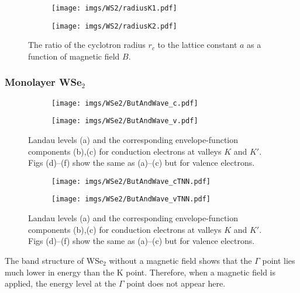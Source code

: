 \documentclass{article}
\begin{document}
\begin{figure}[!h]
	\begin{subfigure}{0.495\textwidth}
		\centering
		\texttt{[image: imgs/WS2/radiusK1.pdf]}
	\end{subfigure}
	\begin{subfigure}{0.495\textwidth}
		\centering
		\texttt{[image: imgs/WS2/radiusK2.pdf]}
	\end{subfigure}
	\caption{The ratio of the cyclotron radius $r_c$ to the lattice constant $a$ as a function of magnetic field $B$.}
\end{figure}
\newpage
\subsubsection*{Monolayer WSe$_{2}$}
\begin{figure}[htb]
	\begin{subfigure}{0.495\textwidth}
		\centering
		\texttt{[image: imgs/WSe2/ButAndWave\_c.pdf]}
	\end{subfigure}
	\begin{subfigure}{0.495\textwidth}
		\centering
		\texttt{[image: imgs/WSe2/ButAndWave\_v.pdf]}
	\end{subfigure}
	\caption{Landau levels (a) and the corresponding envelope-function components (b),(c) for conduction electrons at valleys $K$ and $K'$. Figs (d)–(f) show the same as (a)–(c) but for valence electrons.}
\end{figure}
\begin{figure}[!h]
	\begin{subfigure}{0.495\textwidth}
		\centering
		\texttt{[image: imgs/WSe2/ButAndWave\_cTNN.pdf]}
	\end{subfigure}
	\begin{subfigure}{0.495\textwidth}
		\centering
		\texttt{[image: imgs/WSe2/ButAndWave\_vTNN.pdf]}
	\end{subfigure}
	\caption{Landau levels (a) and the corresponding envelope-function components (b),(c) for conduction electrons at valleys $K$ and $K'$. Figs (d)–(f) show the same as (a)–(c) but for valence electrons.}
\end{figure}
The band structure of WSe$_{2}$ without a magnetic field shows that the $\Gamma$ point lies much lower in energy than the K point. Therefore, when a magnetic field is applied, the energy level at the $\Gamma$ point does not appear here.
\end{document}
